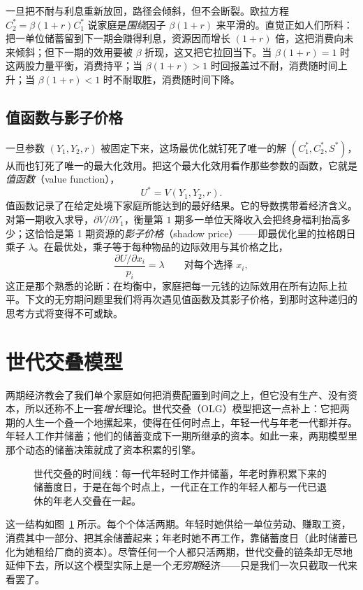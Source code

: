 一旦把不耐与利息重新放回，路径会倾斜，但不会断裂。欧拉方程 $C_2^* = \beta(1+r)C_1^*$ 说家庭是\emph{围绕}因子 $\beta(1+r)$ 来平滑的。直觉正如人们所料：把一单位储蓄留到下一期会赚得利息，资源因而增长 $(1+r)$ 倍，这把消费向未来倾斜；但下一期的效用要被 $\beta$ 折现，这又把它拉回当下。当 $\beta(1+r) = 1$ 时这两股力量平衡，消费持平；当 $\beta(1+r) > 1$ 时回报盖过不耐，消费随时间上升；当 $\beta(1+r) < 1$ 时不耐取胜，消费随时间下降。

\subsection{值函数与影子价格}

一旦参数 $(Y_1, Y_2, r)$ 被固定下来，这场最优化就钉死了唯一的解 $(C_1^*, C_2^*, S^*)$，从而也钉死了唯一的最大化效用。把这个最大化效用看作那些参数的函数，它就是\emph{值函数}（value function），
\[
U^* = V(Y_1, Y_2, r).
\]
值函数记录了在给定处境下家庭所能达到的最好结果。它的导数携带着经济含义。对第一期收入求导，$\partial V / \partial Y_1$，衡量第 $1$ 期多一单位天降收入会把终身福利抬高多少；这恰恰是第 1 期资源的\emph{影子价格}（shadow price）——即最优化里的拉格朗日乘子 $\lambda$。在最优处，乘子等于每种物品的边际效用与其价格之比，
\[
\frac{\partial U / \partial x_i}{p_i} = \lambda \qquad \text{对每个选择 } x_i,
\]
这正是那个熟悉的论断：在均衡中，家庭把每一元钱的边际效用在所有边际上拉平。下文的无穷期问题里我们将再次遇见值函数及其影子价格，到那时这种递归的思考方式将变得不可或缺。

\section{世代交叠模型}

两期经济教会了我们单个家庭如何把消费配置到时间之上，但它没有生产、没有资本，所以还称不上一套\emph{增长}理论。世代交叠（OLG）模型把这一点补上：它把两期的人生一个叠一个地摞起来，使得在任何时点上，年轻一代与年老一代都并存。年轻人工作并储蓄；他们的储蓄变成下一期所继承的资本。如此一来，两期模型里那个动态的储蓄决策就成了资本积累的引擎。

\begin{figure}[h]
\centering

\caption{世代交叠的时间线：每一代年轻时工作并储蓄，年老时靠积累下来的储蓄度日，于是在每个时点上，一代正在工作的年轻人都与一代已退休的年老人交叠在一起。}
\label{fig:macro-5}
\end{figure}

这一结构如图~\ref{fig:macro-5} 所示。每个个体活两期。年轻时她供给一单位劳动、赚取工资，消费其中一部分、把其余储蓄起来；年老时她不再工作，靠储蓄度日（此时储蓄已化为她租给厂商的资本）。尽管任何一个人都只活两期，世代交叠的链条却无尽地延伸下去，所以这个模型实际上是一个\emph{无穷期}经济——只是我们一次只截取一代来看罢了。

